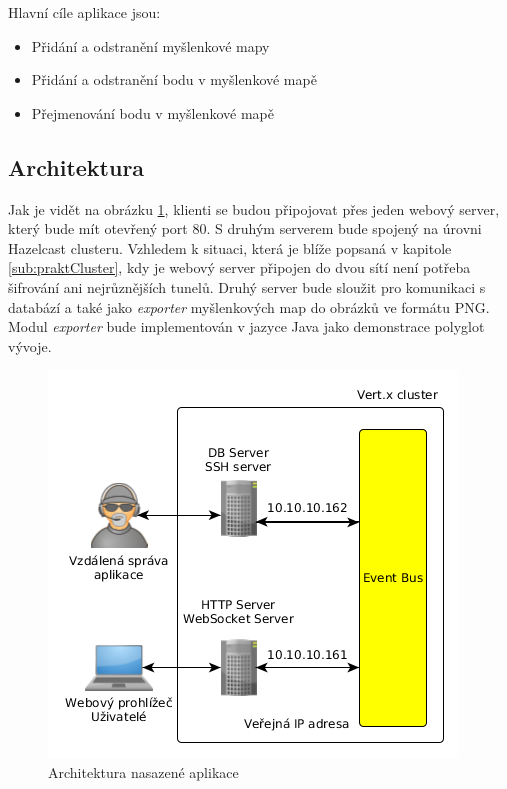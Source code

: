 Hlavní cíle aplikace jsou:
\begin{itemize}
\item Přidání a odstranění myšlenkové mapy
\item Přidání a odstranění bodu v myšlenkové mapě
\item Přejmenování bodu v myšlenkové mapě
\end{itemize}


\subsection{Architektura}

Jak je vidět na obrázku \ref{fig:architecture_real}, klienti se budou připojovat přes jeden webový server, který bude mít otevřený port 80. S druhým serverem bude spojený na úrovni Hazelcast clusteru. Vzhledem k situaci, která je blíže popsaná v kapitole \ref{sub:praktCluster}, kdy je webový server připojen do dvou sítí není potřeba šifrování ani nejrůznějších tunelů. Druhý server bude sloužit pro komunikaci s databází a také jako \emph{exporter} myšlenkových map do obrázků ve formátu PNG. Modul \emph{exporter} bude implementován v jazyce Java jako demonstrace polyglot vývoje.

\begin{figure}[h]
\begin{centering}
\includegraphics[scale=0.5]{obrazky/architecture_real}
\par\end{centering}
\caption{Architektura nasazené aplikace\label{fig:architecture_real}}
\end{figure}

